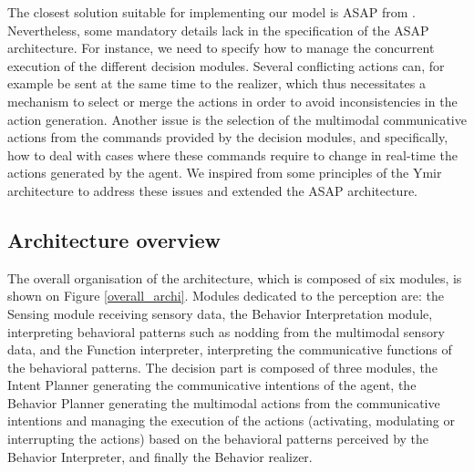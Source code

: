 The closest solution suitable for implementing our model is ASAP from \cite{kopp_architecture_2014}.
Nevertheless, some mandatory details lack in the specification of the ASAP architecture. For instance, we need to specify how to manage the concurrent execution of the different decision modules. Several conflicting actions can, for example be sent at the same time to the realizer, which thus necessitates a mechanism to select or merge the actions in order to avoid inconsistencies in the action generation. Another issue is the selection of the multimodal communicative actions from the commands provided by the decision modules, and specifically, how to deal with cases where these commands require to change in real-time the actions generated by the agent. 
We inspired from some principles of the Ymir architecture to address these issues and extended the ASAP architecture.  

\subsection{Architecture overview}

The overall organisation of the architecture, which is composed of six modules, is shown on Figure \ref{overall_archi}. 
Modules dedicated to the perception are: 
the Sensing module receiving sensory data, 
the Behavior Interpretation module, interpreting behavioral patterns such as nodding from the multimodal sensory data, 
and the Function interpreter, interpreting the communicative functions of the behavioral patterns. 
The decision part is composed of three modules, 
the Intent Planner generating the communicative intentions of the agent, 
the Behavior Planner generating the multimodal actions from the communicative intentions and managing the execution of the actions (activating, modulating or interrupting the actions) based on the behavioral patterns perceived by the Behavior Interpreter,
and finally the Behavior realizer. 

